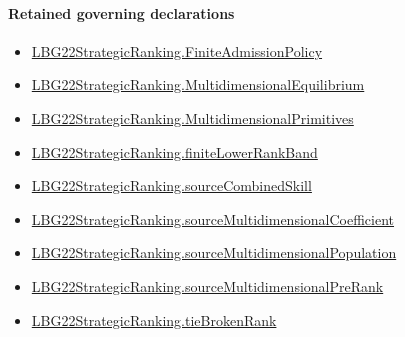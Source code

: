 \documentclass[10pt]{article}
\begin{document}
\paragraph{Retained governing declarations}
\begin{itemize}\raggedright
\item \hyperlink{paper-prerequisite-d056dd7c8060653c}{LBG22\allowbreak{}Strategic\allowbreak{}Ranking.\allowbreak{}Finite\allowbreak{}Admission\allowbreak{}Policy}
\item \hyperlink{paper-prerequisite-b201854e4e4dd891}{LBG22\allowbreak{}Strategic\allowbreak{}Ranking.\allowbreak{}Multidimensional\allowbreak{}Equilibrium}
\item \hyperlink{paper-prerequisite-8e74a377842bef95}{LBG22\allowbreak{}Strategic\allowbreak{}Ranking.\allowbreak{}Multidimensional\allowbreak{}Primitives}
\item \hyperlink{paper-prerequisite-a42f440ddc254fa7}{LBG22\allowbreak{}Strategic\allowbreak{}Ranking.\allowbreak{}finite\allowbreak{}Lower\allowbreak{}Rank\allowbreak{}Band}
\item \hyperlink{governing-declaration-e17c2a81c5471276}{LBG22\allowbreak{}Strategic\allowbreak{}Ranking.\allowbreak{}source\allowbreak{}Combined\allowbreak{}Skill}
\item \hyperlink{paper-prerequisite-e57e55071c75ce91}{LBG22\allowbreak{}Strategic\allowbreak{}Ranking.\allowbreak{}source\allowbreak{}Multidimensional\allowbreak{}Coefficient}
\item \hyperlink{paper-prerequisite-16d135799a0f0491}{LBG22\allowbreak{}Strategic\allowbreak{}Ranking.\allowbreak{}source\allowbreak{}Multidimensional\allowbreak{}Population}
\item \hyperlink{governing-declaration-9631d67a19f5df1f}{LBG22\allowbreak{}Strategic\allowbreak{}Ranking.\allowbreak{}source\allowbreak{}Multidimensional\allowbreak{}Pre\allowbreak{}Rank}
\item \hyperlink{paper-prerequisite-b7c71e53177b76c6}{LBG22\allowbreak{}Strategic\allowbreak{}Ranking.\allowbreak{}tie\allowbreak{}Broken\allowbreak{}Rank}
\end{itemize}
\end{document}
